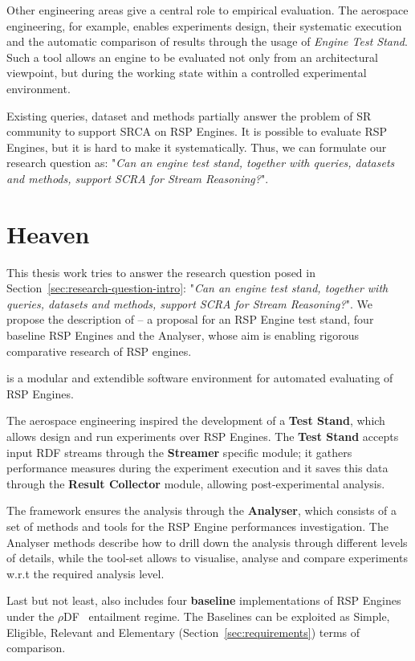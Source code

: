Other engineering areas give a central role to empirical evaluation. The aerospace engineering, for example, enables experiments design, their systematic execution and the automatic comparison of results through the usage of \textit{Engine Test Stand}. Such a tool allows an engine to be evaluated not only from an architectural viewpoint, but during the working state within a controlled experimental environment.

Existing queries, dataset and methods partially answer the problem of SR community to support SRCA on RSP Engines. It is possible to evaluate RSP Engines, but it is hard to make it systematically. Thus, we can formulate our research question as: "\textit{Can an engine test stand, together with queries, datasets and methods, support SCRA for Stream Reasoning?}".

\section{Heaven}\label{sec:heaven-intro}

This thesis work tries to answer the research question posed in Section~\ref{sec:research-question-intro}: "\textit{Can an engine test stand, together with queries, datasets and methods, support SCRA for Stream Reasoning?}". We propose the description of \name -- a proposal for an RSP Engine test stand, four baseline RSP Engines and the Analyser, whose aim is enabling rigorous comparative research of RSP engines. 

\name is a modular and extendible software environment for automated evaluating of RSP Engines. 

The aerospace engineering inspired the development of a \textbf{Test Stand}, which allows design and run experiments over RSP Engines. The \textbf{Test Stand} accepts input RDF streams through the \textbf{Streamer} specific module; it gathers performance measures during the experiment execution and it saves this data through the \textbf{Result Collector} module, allowing post-experimental analysis.

The framework ensures the analysis through the \textbf{Analyser}, which consists of a set of methods and tools for the RSP Engine performances investigation. The Analyser methods describe how to drill down the analysis through different levels of details, while the tool-set allows to visualise, analyse and compare experiments w.r.t the required analysis level. 

Last but not least, \name also includes four \textbf{baseline} implementations of RSP Engines under the $\rho$DF~\cite{DBLP:conf/esws/MunozPG07} entailment regime. The Baselines can be exploited  as Simple, Eligible, Relevant and Elementary (Section~\ref{sec:requirements}) terms of comparison.  

